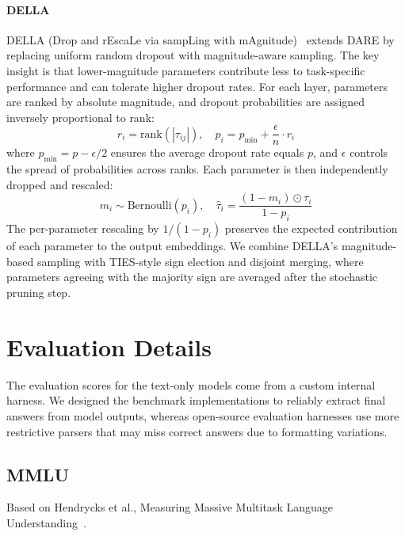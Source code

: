\documentclass{article}
\begin{document}
\paragraph{DELLA}
DELLA (Drop and rEscaLe via sampLing with mAgnitude)~\citep{deep2024dellamergingreducinginterferencemodel} extends DARE by replacing uniform random dropout with magnitude-aware sampling. The key insight is that lower-magnitude parameters contribute less to task-specific performance and can tolerate higher dropout rates. For each layer, parameters are ranked by absolute magnitude, and dropout probabilities are assigned inversely proportional to rank:
\begin{equation}
r_i = \text{rank}(|\tau_{ij}|), \quad p_i = p_{\min} + \frac{\epsilon}{n} \cdot r_i
\end{equation}
where $p_{\min} = p - \epsilon/2$ ensures the average dropout rate equals $p$, and $\epsilon$ controls the spread of probabilities across ranks. Each parameter is then independently dropped and rescaled:
\begin{equation}
m_i \sim \text{Bernoulli}(p_i), \quad \hat{\tau}_i = \frac{(1 - m_i) \odot \tau_i}{1 - p_i}
\end{equation}
The per-parameter rescaling by $1/(1-p_i)$ preserves the expected contribution of each parameter to the output embeddings. We combine DELLA's magnitude-based sampling with TIES-style sign election and disjoint merging, where parameters agreeing with the majority sign are averaged after the stochastic pruning step.



\section{Evaluation Details}
\label{app:evaluation}

The evaluation scores for the text-only models come from a custom internal harness. We designed the benchmark implementations to reliably extract final answers from model outputs, whereas open-source evaluation harnesses use more restrictive parsers that may miss correct answers due to formatting variations.

\subsection*{MMLU}

Based on Hendrycks et al., Measuring Massive Multitask Language Understanding~\citep{hendrycks2021mmlu}.
\end{document}
